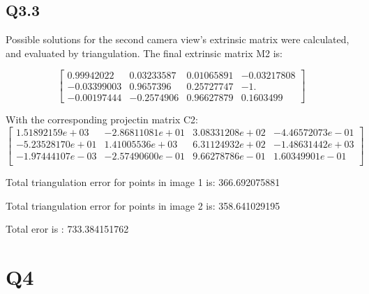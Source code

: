 \documentclass[12pt]{article}
\begin{document}
\newpage
\subsection{Q3.3}
Possible solutions for the second camera view's extrinsic matrix were calculated, and evaluated by triangulation.
The final extrinsic matrix M2 is:
  
$$
\begin{bmatrix}
0.99942022& 0.03233587& 0.01065891& -0.03217808 \\
-0.03399003& 0.9657396& 0.25727747& -1.         \\
-0.00197444& -0.2574906& 0.96627879& 0.1603499
\end{bmatrix}
$$
  
With the corresponding projectin matrix C2:
$$
\begin{bmatrix}
1.51892159e+03& -2.86811081e+01& 3.08331208e+02& -4.46572073e-01 \\
-5.23528170e+01& 1.41005536e+03& 6.31124932e+02& -1.48631442e+03 \\
-1.97444107e-03& -2.57490600e-01& 9.66278786e-01& 1.60349901e-01 \\
\end{bmatrix}
$$
  
Total triangulation error for points in image 1 is: 366.692075881  
  
Total triangulation error for points in image 2 is: 358.641029195  
  
Total eror is : 733.384151762  
  

\newpage
\section{Q4}
\end{document}
